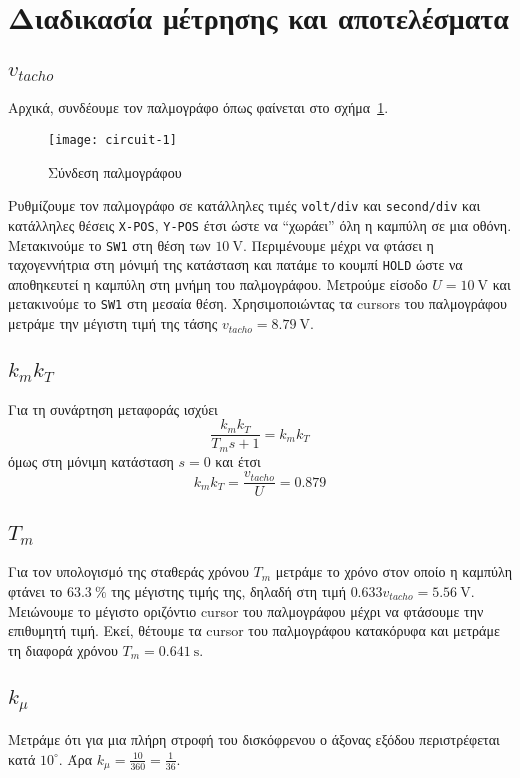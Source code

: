 \section{Διαδικασία μέτρησης και αποτελέσματα}
\subsection{$v_{tacho}$}
Αρχικά, συνδέουμε τον παλμογράφο όπως φαίνεται στο σχήμα~\ref{fig:circuit-1}.
\begin{figure}[htb]
    \centering
    \texttt{[image: circuit-1]}
    \caption{Σύνδεση παλμογράφου}
    \label{fig:circuit-1}
\end{figure}
Ρυθμίζουμε τον παλμογράφο σε κατάλληλες τιμές \texttt{volt/div} και \texttt{second/div}
και κατάλληλες θέσεις \texttt{X-POS}, \texttt{Y-POS} έτσι ώστε να ``χωράει'' όλη η καμπύλη σε μια οθόνη.
Μετακινούμε το \texttt{SW1} στη θέση των $\SI{+10}{\volt}$.
Περιμένουμε μέχρι να φτάσει η ταχογεννήτρια στη μόνιμή της κατάσταση και πατάμε το κουμπί \texttt{HOLD} ώστε να αποθηκευτεί η καμπύλη στη μνήμη του παλμογράφου.
Μετρούμε είσοδο $U = \SI{10}{\volt}$ και μετακινούμε το \texttt{SW1} στη μεσαία θέση.
Χρησιμοποιώντας τα cursors του παλμογράφου μετράμε την μέγιστη τιμή της τάσης $v_{tacho} = \SI{8.79}{\volt}$.

\subsection{$k_m k_T$}
Για τη συνάρτηση μεταφοράς ισχύει
\begin{equation*}
    \frac{k_m k_T}{T_m s + 1} = k_m k_T
\end{equation*}
όμως στη μόνιμη κατάσταση $s = 0$ και έτσι
\begin{equation*}
    k_m k_T = \frac{v_{tacho}}{U} = 0.879
\end{equation*}

\subsection{$T_m$}
Για τον υπολογισμό της σταθεράς χρόνου $T_m$ μετράμε το χρόνο στον οποίο η καμπύλη φτάνει το $\SI{63.3}{\percent}$ της μέγιστης τιμής της, δηλαδή στη τιμή $0.633 v_{tacho} = \SI{5.56}{\volt}$.
Μειώνουμε το μέγιστο οριζόντιο cursor του παλμογράφου μέχρι να φτάσουμε την επιθυμητή τιμή.
Εκεί, θέτουμε τα cursor του παλμογράφου κατακόρυφα και μετράμε τη διαφορά χρόνου $T_m = \SI{0.641}{\second}$.

\subsection[$k_{μ}$]{$k_{\mu}$}
Μετράμε ότι για μια πλήρη στροφή του δισκόφρενου ο άξονας εξόδου περιστρέφεται κατά $10^{\circ}$.
Άρα $k_{\mu} = \frac{10}{360} = \frac{1}{36}$.

